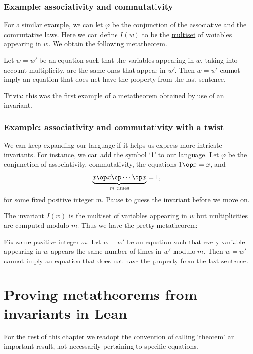 \subsubsection*{Example: associativity and commutativity}
For a similar example, we can let $\varphi$ be the conjunction of the associative and the commutative laws. Here we can define $I(w)$ to be the \href{https://en.wikipedia.org/wiki/Multiset}{multiset} of variables appearing in $w$. We obtain the following metatheorem.

\begin{metatheorem}
	Let $w = w'$ be an equation such that the variables appearing in $w$, taking into account multiplicity, are the same ones that appear in $w'$. Then $w = w'$ cannot imply an equation that does not have the property from the last sentence.
\end{metatheorem}

Trivia: this was the first example of a metatheorem obtained by use of an invariant.

\subsubsection*{Example: associativity and commutativity with a twist}
We can keep expanding our language if it helps us express more intricate invariants. For instance, we can add the symbol `1' to our language. Let $\varphi$ be the conjunction of associativity, commutativity, the equations $1 \op x = x$, and
\[
\underbrace{x \op x \op \cdots \op x}_{m\text{ times}} = 1,
\]
for some fixed positive integer $m$. Pause to guess the invariant before we move on.

The invariant $I(w)$ is the multiset of variables appearing in $w$ but multiplicities are computed modulo $m$. Thus we have the pretty metatheorem:
\begin{metatheorem}
	Fix some positive integer $m$. Let $w = w'$ be an equation such that every variable appearing in $w$ appears the same number of times in $w'$ modulo $m$. Then $w = w'$ cannot imply an equation that does not have the property from the last sentence.
\end{metatheorem}

\section{Proving metatheorems from invariants in Lean}

For the rest of this chapter we readopt the convention of calling `theorem' an important result, not necessarily pertaining to specific equations.

